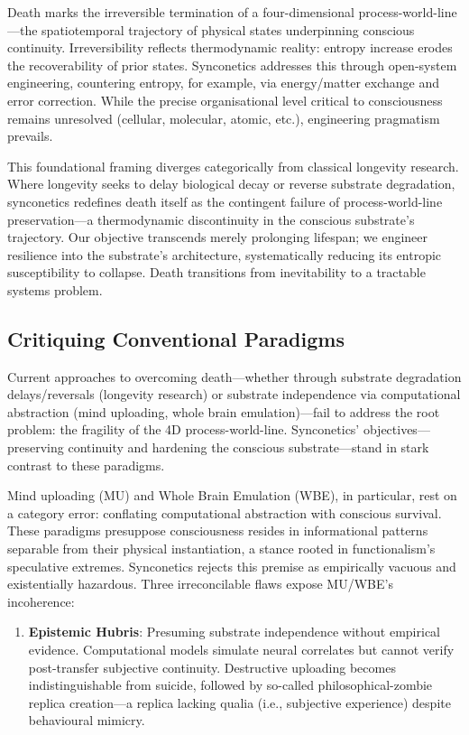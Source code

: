 \documentclass[10pt]{article}
\begin{document}
\begin{sloppypar}
  Death marks the irreversible termination of a four-dimensional process-world-line—the spatiotemporal trajectory of physical states underpinning conscious continuity. Irreversibility reflects thermodynamic reality: entropy increase erodes the recoverability of prior states. Synconetics addresses this through open-system engineering, countering entropy, for example, via energy/matter exchange and error correction. While the precise organisational level critical to consciousness remains unresolved (cellular, molecular, atomic, etc.), engineering pragmatism prevails.

  This foundational framing diverges categorically from classical longevity research. Where longevity seeks to delay biological decay or reverse substrate degradation, synconetics redefines death itself as the contingent failure of process-world-line preservation—a thermodynamic discontinuity in the conscious substrate’s trajectory. Our objective transcends merely prolonging lifespan; we engineer resilience into the substrate’s architecture, systematically reducing its entropic susceptibility to collapse. Death transitions from inevitability to a tractable systems problem.

  \subsection{Critiquing Conventional Paradigms}
  \label{sec:new-paradigm}

  Current approaches to overcoming death—whether through substrate degradation delays/reversals (longevity research) or substrate independence via computational abstraction (mind uploading, whole brain emulation)—fail to address the root problem: the fragility of the 4D process-world-line. Synconetics’ objectives—preserving continuity and hardening the conscious substrate—stand in stark contrast to these paradigms.

  Mind uploading (MU) and Whole Brain Emulation (WBE), in particular, rest on a category error: conflating computational abstraction with conscious survival. These paradigms presuppose consciousness resides in informational patterns separable from their physical instantiation, a stance rooted in functionalism’s speculative extremes. Synconetics rejects this premise as empirically vacuous and existentially hazardous. Three irreconcilable flaws expose MU/WBE’s incoherence:

  \begin{enumerate}
    \item \textbf{Epistemic Hubris}: Presuming substrate independence without empirical evidence. Computational models simulate neural correlates but cannot verify post-transfer subjective continuity. Destructive uploading becomes indistinguishable from suicide, followed by so-called philosophical-zombie replica creation—a replica lacking qualia (i.e., subjective experience) despite behavioural mimicry.


\end{enumerate}
\end{sloppypar}
\end{document}
